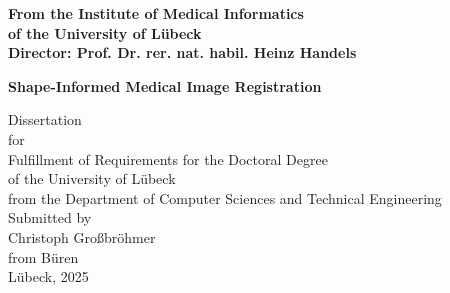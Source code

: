 \begin{titlepage}

    \addtolength{\topmargin}{-1.2cm}
    \addtolength{\textwidth}{2.35cm}

    \vspace*{-2.7cm}
    \vspace*{0.4cm}

    \begin{center}


        \enlargethispage{5cm}
        \textbf{From the Institute of Medical Informatics}\\
        \textbf{of the University of Lübeck}\\
        \textbf{Director: Prof. Dr. rer. nat. habil. Heinz Handels}\\[2.8cm]
        \begin{Large}
            \textbf{Shape-Informed Medical Image Registration
            }\\ %
        \end{Large}

        \vspace*{2.5cm}

        Dissertation\\
        for\\
        Fulfillment of Requirements for the Doctoral Degree\\
        of the University of Lübeck\\[1.0cm]
        from the Department of Computer Sciences and Technical Engineering\\[1.0cm]
        Submitted by\\[0.1cm]
        Christoph Großbröhmer\\[0.1cm]
        from Büren\\[3.0cm]
        Lübeck, 2025
        \end{center}


    \newpage
    \thispagestyle{empty}

    \addtolength{\topmargin}{1.2cm}
    \addtolength{\textwidth}{-2.35cm}
\end{titlepage}


